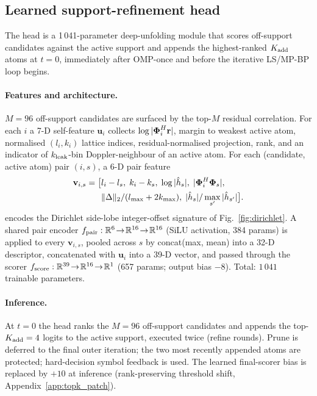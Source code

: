 \subsection{Learned support-refinement head}
\label{ssec:c2rel}

The head is a 1\,041-parameter deep-unfolding module that scores
off-support candidates against the active support and appends the
highest-ranked $K_{\mathrm{add}}$ atoms at $t=0$, immediately after OMP-once
and before the iterative LS/MP-BP loop begins.

\paragraph{Features and architecture.}
$M=96$ off-support candidates are surfaced by the top-$M$ residual
correlation. For each $i$ a 7-D self-feature $\mathbf{u}_i$ collects
$\log|\boldsymbol{\Phi}_i^H\mathbf{r}|$, margin to weakest active atom,
normalised $(l_i,k_i)$ lattice indices, residual-normalised projection,
rank, and an indicator of $k_{\mathrm{leak}}$-bin Doppler-neighbour of an active
atom. For each (candidate, active atom) pair $(i,s)$, a 6-D pair
feature
\begin{equation}
\begin{aligned}
\mathbf{v}_{i,s}=\bigl[&
l_i-l_s,\; k_i-k_s,\; \log|\hat{h}_s|,\;
|\boldsymbol{\Phi}_i^H\boldsymbol{\Phi}_s|,\\
&\|\Delta\|_2/(l_{\max}+2k_{\max}),\;
|\hat{h}_s|/\max_{s'}|\hat{h}_{s'}|\bigr].
\end{aligned}
\label{eq:pairfeature}
\end{equation}
encodes the Dirichlet side-lobe integer-offset signature of
Fig.~\ref{fig:dirichlet}. A shared pair encoder
$f_\text{pair}:\mathbb{R}^{6}\!\to\!\mathbb{R}^{16}\!\to\!\mathbb{R}^{16}$ (SiLU activation,
384 params) is applied to every $\mathbf{v}_{i,s}$, pooled across $s$
by concat(max, mean) into a 32-D descriptor, concatenated with
$\mathbf{u}_i$ into a 39-D vector, and passed through the scorer
$f_\text{score}:\mathbb{R}^{39}\!\to\!\mathbb{R}^{16}\!\to\!\mathbb{R}^{1}$ (657 params; output
bias $-8$). Total: $1\,041$ trainable parameters.

\paragraph{Inference.}
At $t=0$ the head ranks the $M=96$ off-support candidates and appends
the top-$K_{\mathrm{add}}=4$ logits to the active support, executed twice (refine
rounds). Prune is deferred to the final outer iteration; the two most
recently appended atoms are protected; hard-decision symbol feedback is
used. The learned final-scorer bias is replaced by $+10$ at inference
(rank-preserving threshold shift, Appendix~\ref{app:topk_patch}).

